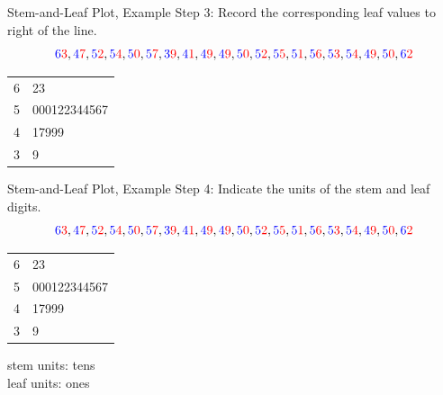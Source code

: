 \documentclass{beamer}
\newcommand{\blue}[1]{{\color{blue} #1}}
\newcommand{\red}[1]{{\color{red} #1}}
\newcommand{\bluRed}[2]{{\color{blue} #1}{\color{red} #2}}
\begin{document}
\begin{frame}{Stem-and-Leaf Plot, Example}
    Step 3: Record the corresponding \red{leaf} values to right of the line.
    \[\bluRed{6}{3},
        \bluRed{4}{7},
        \bluRed{5}{2},
        \bluRed{5}{4},
        \bluRed{5}{0},
        \bluRed{5}{7},
        \bluRed{3}{9},
        \bluRed{4}{1},
        \bluRed{4}{9},
        \bluRed{4}{9},
        \bluRed{5}{0},
        \bluRed{5}{2},
        \bluRed{5}{5},
        \bluRed{5}{1},
        \bluRed{5}{6},
        \bluRed{5}{3},
        \bluRed{5}{4},
        \bluRed{4}{9},
        \bluRed{5}{0},
        \bluRed{6}{2}\]
    \begin{table}
        \begin{tabular}{r | l}
            \blue{6} & \red{23}           \\
            \blue{5} & \red{000122344567} \\
            \blue{4} & \red{17999}        \\
            \blue{3} & \red{9}            \\
        \end{tabular}
    \end{table}
\end{frame}

\begin{frame}{Stem-and-Leaf Plot, Example}
    Step 4: Indicate the units of the \red{stem} and \blue{leaf} digits.
    \[\bluRed{6}{3},
        \bluRed{4}{7},
        \bluRed{5}{2},
        \bluRed{5}{4},
        \bluRed{5}{0},
        \bluRed{5}{7},
        \bluRed{3}{9},
        \bluRed{4}{1},
        \bluRed{4}{9},
        \bluRed{4}{9},
        \bluRed{5}{0},
        \bluRed{5}{2},
        \bluRed{5}{5},
        \bluRed{5}{1},
        \bluRed{5}{6},
        \bluRed{5}{3},
        \bluRed{5}{4},
        \bluRed{4}{9},
        \bluRed{5}{0},
        \bluRed{6}{2}\]
    \begin{table}
        \begin{tabular}{r | l}
            \blue{6} & \red{23}           \\
            \blue{5} & \red{000122344567} \\
            \blue{4} & \red{17999}        \\
            \blue{3} & \red{9}            \\
        \end{tabular}
    \end{table}
    \blue{stem units: tens}\\
    \red{leaf units: ones}
\end{frame}
\end{document}
